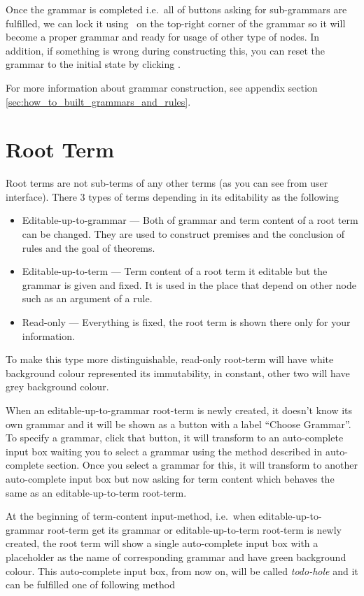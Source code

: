 \documentclass[master.tex]{subfiles}
\begin{document}
Once the grammar is completed i.e.\ all of buttons asking for sub-grammars are
fulfilled, we can lock it using \lockButton\ on the top-right corner of the
grammar so it will become a proper grammar and ready for usage of other type of
nodes. In addition, if something is wrong during constructing this, you can
reset the grammar to the initial state by clicking \resetButton.

For more information about grammar construction, see appendix section
\ref{sec:how_to_built_grammars_and_rules}.

\section{Root Term}

Root terms are not sub-terms of any other terms (as you can see from user
interface). There 3 types of terms depending in its editability as the following
\begin{itemize}
\item Editable-up-to-grammar --- Both of grammar and term content of a root term
  can be changed. They are used to construct premises and the conclusion of
  rules and the goal of theorems.
\item Editable-up-to-term --- Term content of a root term it editable
 but the grammar is given and fixed. It is used in the place that depend on
 other node such as an argument of a rule.
\item Read-only --- Everything is fixed, the root term is shown there only for
  your information.
\end{itemize}

To make this type more distinguishable, read-only root-term will have white
background colour represented its immutability, in constant, other two will have
grey background colour.

When an editable-up-to-grammar root-term is newly created, it doesn't know its
own grammar and it will be shown as a button with a label ``Choose Grammar''. To
specify a grammar, click that button, it will transform to an auto-complete
input box waiting you to select a grammar using the method described in
auto-complete section. Once you select a grammar for this, it will transform to
another auto-complete input box but now asking for term content which behaves
the same as an editable-up-to-term root-term.

At the beginning of term-content input-method, i.e.\ when editable-up-to-grammar
root-term get its grammar or editable-up-to-term root-term is newly created, the
root term will show a single auto-complete input box with a placeholder as the
name of corresponding grammar and have green background colour. This
auto-complete input box, from now on, will be called \emph{todo-hole} and it can
be fulfilled one of following method
\end{document}
